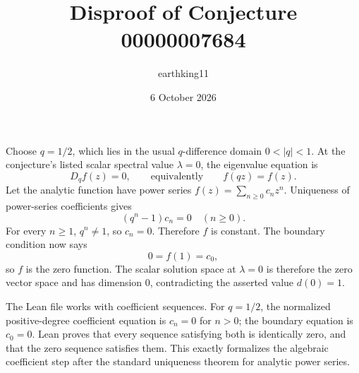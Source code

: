 \documentclass[11pt]{article}
\title{Disproof of Conjecture 00000007684}
\author{earthking11}
\date{6 October 2026}
\begin{document}
\maketitle

Choose $q=1/2$, which lies in the usual $q$-difference domain
$0<|q|<1$.  At the conjecture's listed scalar spectral value $\lambda=0$,
the eigenvalue equation is
\[
 D_q f(z)=0,
 \qquad\text{equivalently}\qquad f(qz)=f(z).
\]
Let the analytic function have power series $f(z)=\sum_{n\ge0}c_nz^n$.
Uniqueness of power-series coefficients gives
\[
 (q^n-1)c_n=0\quad(n\ge0).
\]
For every $n\ge1$, $q^n\ne1$, so $c_n=0$.  Therefore $f$ is constant.
The boundary condition now says
\[
 0=f(1)=c_0,
\]
so $f$ is the zero function.  The scalar solution space at $\lambda=0$ is
therefore the zero vector space and has dimension $0$, contradicting the
asserted value $d(0)=1$.

The Lean file works with coefficient sequences.  For $q=1/2$, the normalized
positive-degree coefficient equation is $c_n=0$ for $n>0$; the boundary
equation is $c_0=0$.  Lean proves that every sequence satisfying both is
identically zero, and that the zero sequence satisfies them.  This exactly
formalizes the algebraic coefficient step after the standard uniqueness
theorem for analytic power series.
\end{document}
